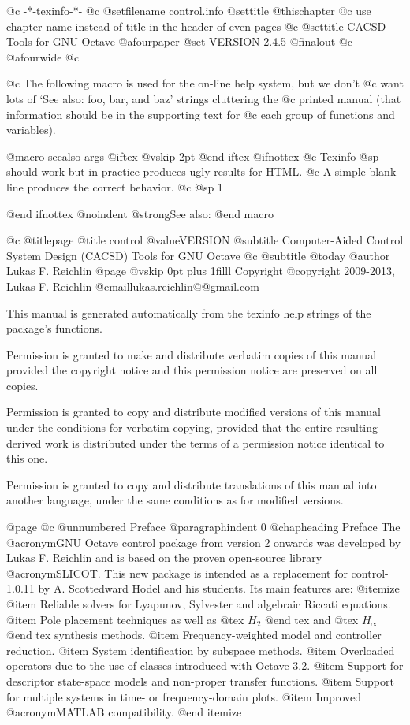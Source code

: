    @c -*-texinfo-*-
@c %
@setfilename control.info
@settitle @thischapter
@c use chapter name instead of title in the header of even pages
@c @settitle CACSD Tools for GNU Octave
@afourpaper
@set VERSION 2.4.5
@finalout
@c @afourwide
@c %


@c The following macro is used for the on-line help system, but we don't
@c want lots of `See also: foo, bar, and baz' strings cluttering the
@c printed manual (that information should be in the supporting text for
@c each group of functions and variables).

@macro seealso {args}
@iftex
@vskip 2pt
@end iftex
@ifnottex
@c Texinfo @sp should work but in practice produces ugly results for HTML.
@c A simple blank line produces the correct behavior. 
@c @sp 1

@end ifnottex
@noindent
@strong{See also:} \args\.
@end macro


@c %
@titlepage
@title control @value{VERSION}
@subtitle Computer-Aided Control System Design (CACSD) Tools for GNU Octave
@c @subtitle @today{}
@author Lukas F. Reichlin
@page
@vskip 0pt plus 1filll
Copyright @copyright{} 2009-2013, Lukas F. Reichlin @email{lukas.reichlin@@gmail.com}

This manual is generated automatically from the texinfo help strings
of the package's functions.

Permission is granted to make and distribute verbatim copies of
this manual provided the copyright notice and this permission notice
are preserved on all copies.

Permission is granted to copy and distribute modified versions of this
manual under the conditions for verbatim copying, provided that the entire
resulting derived work is distributed under the terms of a permission
notice identical to this one.

Permission is granted to copy and distribute translations of this manual
into another language, under the same conditions as for modified versions.


@page
@c @unnumbered Preface
@paragraphindent 0
@chapheading Preface
The @acronym{GNU} Octave control package from version 2 onwards was
developed by Lukas F. Reichlin and is based on the proven open-source
library @acronym{SLICOT}. This new package is intended as a replacement
for control-1.0.11 by A. Scottedward Hodel and his students.
Its main features are:
@itemize
@item Reliable solvers for Lyapunov, Sylvester and algebraic Riccati equations.
@item Pole placement techniques as well as @tex $ H_2 $ @end tex
and @tex $ H_{\infty} $ @end tex
synthesis methods.
@item Frequency-weighted model and controller reduction.
@item System identification by subspace methods.
@item Overloaded operators due to the use of classes introduced with Octave 3.2.
@item Support for descriptor state-space models and non-proper transfer functions.
@item Support for multiple systems in time- or frequency-domain plots.
@item Improved @acronym{MATLAB} compatibility.
@end itemize


